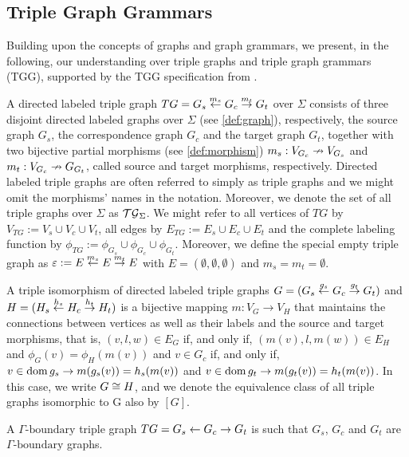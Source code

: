 \documentclass[]{report}
\begin{document}
\subsection{Triple Graph Grammars}
Building upon the concepts of graphs and graph grammars, we present, in the following, our understanding over triple graphs and triple graph grammars (TGG), supported by the TGG specification from \cite{schurr1994specification}.


\begin{definition}
	A directed labeled triple graph $TG = G_s \overset{m_s}{\leftarrow} G_c \overset{m_t}{\rightarrow} G_t$ over $\Sigma$ consists of three disjoint directed labeled graphs over $\Sigma$ (see \ref{def:graph}), respectively, the source graph $G_s$, the correspondence graph $G_c$ and the target graph $G_t$, together with two bijective partial morphisms (see \ref{def:morphism}) $m_s: V_{G_c} \nrightarrow V_{G_s}$ and $m_t : V_{G_c} \nrightarrow G_{G_t}$, called source and target morphisms, respectively. Directed labeled triple graphs are often referred to simply as triple graphs and we might omit the morphisms' names in the notation. Moreover, we denote the set of all triple graphs over $\Sigma$ as $\mathcal{TG}_{\Sigma}$. We might refer to all vertices of $TG$ by $V_{TG}:= V_s \cup V_c \cup V_t$, all edges by $E_{TG}:= E_s \cup E_c \cup E_t$ and the complete labeling function by $\phi_{TG}:= \phi_{G_s} \cup \phi_{G_c} \cup \phi_{G_t}$.
	Moreover, we define the special empty triple graph as $\varepsilon := E \overset{m_s}{\leftarrow} E \overset{m_t}{\rightarrow} E$ with $E = (\emptyset, \emptyset, \emptyset)$ and $m_s = m_t = \emptyset$.
\end{definition}

\begin{definition}
	A triple isomorphism of directed labeled triple graphs $G = (G_s \overset{g_s}{\leftarrow} G_c \overset{g_t}{\rightarrow} G_t)$ and $H = (H_s \overset{h_s}{\leftarrow} H_c \overset{h_t}{\rightarrow} H_t)$ is a bijective mapping $m: V_G \to V_H$ that maintains the connections between vertices as well as their labels and the source and target morphisms, that is, $(v,l,w) \in E_G$ if, and only if, $(m(v),l,m(w)) \in E_H$ and $\phi_G(v) = \phi_H(m(v))$ and $v \in G_c$ if, and only if, $v \in \operatorname{dom} g_s \rightarrow m(g_s(v)) = h_s(m(v))$ and $v \in \operatorname{dom} g_t \rightarrow m(g_t(v)) = h_t(m(v))$. In this case, we write $G \cong H$, and we denote the equivalence class of all triple graphs isomorphic to G also by $[G]$.
\end{definition}

\begin{definition}
	A $\Gamma\text{-boundary}$ triple graph $TG = G_s \overset{}{\leftarrow} G_c \overset{}{\rightarrow} G_t$ is such that $G_s$, $G_c$ and $G_t$ are $\Gamma\text{-boundary}$ graphs.
\end{definition}
\end{document}
